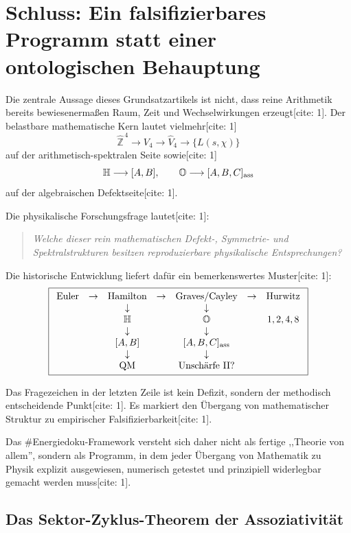\documentclass[11pt,a4paper]{article}
\newcommand{\OO}{\mathbb{O}}
\newcommand{\HH}{\mathbb{H}}
\newcommand{\ZZ}{\mathbb{Z}}
\begin{document}
	\section{Schluss: Ein falsifizierbares Programm statt einer ontologischen Behauptung}
	Die zentrale Aussage dieses Grundsatzartikels ist nicht, dass reine Arithmetik bereits bewiesenermaßen Raum, Zeit und Wechselwirkungen erzeugt[cite: 1]. Der belastbare mathematische Kern lautet vielmehr[cite: 1]
	\[
	\widehat{\ZZ}^{\,4}\longrightarrow V_4\longrightarrow\widehat V_4\longrightarrow\{L(s,\chi)\}
	\]
	auf der arithmetisch-spektralen Seite sowie[cite: 1]
	\[
	\HH\longrightarrow[A,B],\qquad \OO\longrightarrow[A,B,C]_{\rm ass}
	\]
	auf der algebraischen Defektseite[cite: 1].
	
	Die physikalische Forschungsfrage lautet[cite: 1]:
	\begin{quote}
		\emph{Welche dieser rein mathematischen Defekt-, Symmetrie- und Spektralstrukturen besitzen reproduzierbare physikalische Entsprechungen?}
	\end{quote}
	
	Die historische Entwicklung liefert dafür ein bemerkenswertes Muster[cite: 1]:
	\[
	\boxed{
		\begin{array}{ccccccc}
			\text{Euler}&\to&\text{Hamilton}&\to&\text{Graves/Cayley}&\to&\text{Hurwitz}\\
			&&\downarrow&&\downarrow&&\\
			&&\HH&&\OO&&1,2,4,8\\
			&&\downarrow&&\downarrow&&\\
			&&[A,B]&&[A,B,C]_{\rm ass}\\
			&&\downarrow&&\downarrow&&\\
			&&\text{QM}&&\text{Unschärfe II?}
	\end{array}}
	\]
	
	Das Fragezeichen in der letzten Zeile ist kein Defizit, sondern der methodisch entscheidende Punkt[cite: 1]. Es markiert den Übergang von mathematischer Struktur zu empirischer Falsifizierbarkeit[cite: 1].
	
	Das \#Energiedoku-Framework versteht sich daher nicht als fertige ,,Theorie von allem'', sondern als Programm, in dem jeder Übergang von Mathematik zu Physik explizit ausgewiesen, numerisch getestet und prinzipiell widerlegbar gemacht werden muss[cite: 1].
	
	\subsection{Das Sektor-Zyklus-Theorem der Assoziativität}
	\label{sec:sector_theorem}
	
\end{document}
